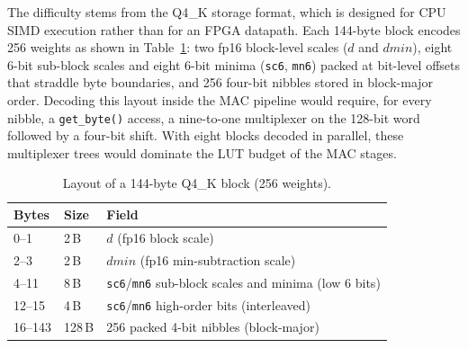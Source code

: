 The difficulty stems from the Q4\_K storage format, which is designed for CPU SIMD
execution rather than for an FPGA datapath. Each 144-byte block encodes 256 weights as
shown in Table~\ref{tab:q4k_block}: two fp16 block-level scales ($d$ and $dmin$), eight
6-bit sub-block scales and eight 6-bit minima (\texttt{sc6}, \texttt{mn6}) packed at
bit-level offsets that straddle byte boundaries, and 256 four-bit nibbles stored in
block-major order. Decoding this layout inside the MAC pipeline would require, for every
nibble, a \texttt{get\_byte()} access, a nine-to-one multiplexer on the 128-bit word
followed by a four-bit shift. With eight blocks decoded in parallel, these multiplexer
trees would dominate the LUT budget of the MAC stages.

\begin{table}[htbp]
\centering
\caption{Layout of a 144-byte Q4\_K block (256 weights).}
\label{tab:q4k_block}
\begin{tabular}{lll}
\hline
\textbf{Bytes} & \textbf{Size} & \textbf{Field} \\ \hline
0--1    & 2\,B   & $d$ (fp16 block scale) \\
2--3    & 2\,B   & $dmin$ (fp16 min-subtraction scale) \\
4--11   & 8\,B   & \texttt{sc6}/\texttt{mn6} sub-block scales and minima (low 6 bits) \\
12--15  & 4\,B   & \texttt{sc6}/\texttt{mn6} high-order bits (interleaved) \\
16--143 & 128\,B & 256 packed 4-bit nibbles (block-major) \\ \hline
\end{tabular}
\end{table}

